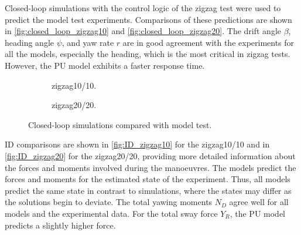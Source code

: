 Closed-loop simulations with the control logic of the zigzag test were used to predict the model test experiments. Comparisons of these predictions are shown in \autoref{fig:closed_loop_zigzag10} and \autoref{fig:closed_loop_zigzag20}. The drift angle $\beta$, heading angle $\psi$, and yaw rate $r$ are in good agreement with the experiments for all the models, especially the heading, which is the most critical in zigzag tests. However, the PU model exhibits a faster response time.

\begin{figure}
    \centering
    \begin{subfigure}[b]{0.49\textwidth}
        \centering
        
        \caption{zigzag10/10.}
        \label{fig:closed_loop_zigzag10}
    \end{subfigure}
    \hfill
    \begin{subfigure}[b]{0.49\textwidth}
        \centering
        
        \caption{zigzag20/20.}
        \label{fig:closed_loop_zigzag20}
    \end{subfigure}
    \caption{Closed-loop simulations compared with model test.}
    \label{fig:closed_loop}
\end{figure}
%    
%    
ID comparisons are shown in \autoref{fig:ID_zigzag10} for the zigzag10/10 and in \autoref{fig:ID_zigzag20} for the zigzag20/20, providing more detailed information about the forces and moments involved during the manoeuvres. The models predict the forces and moments for the estimated state of the experiment. Thus, all models predict the same state in contrast to simulations, where the states may differ as the solutions begin to deviate.    
The total yawing moments $N_D$ agree well for all models and the experimental data. For the total sway force $Y_R$, the PU model predicts a slightly higher force.  

